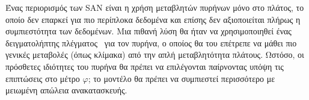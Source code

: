 Ένας περιορισμός των SAN είναι η χρήση μεταβλητών πυρήνων μόνο στο πλάτος, το οποίο δεν επαρκεί για πιο περίπλοκα δεδομένα και επίσης δεν αξιοποιείται πλήρως η συμπιεστότητα των δεδομένων.
Μια πιθανή λύση θα ήταν να χρησιμοποιηθεί ένας δειγματολήπτης πλέγματος~\cite{jaderberg2015spatial} για τον πυρήνα, ο οποίος θα του επέτρεπε να μάθει πιο γενικές μεταβολές (όπως κλίμακα) από την απλή μεταβλητότητα πλάτους.
Ωστόσο, οι πρόσθετες ιδιότητες του πυρήνα θα πρέπει να επιλέγονται παίρνοντας υπόψη τις επιπτώσεις στο μέτρο $\varphi$; το μοντέλο θα πρέπει να συμπιεστεί περισσότερο με μειωμένη απώλεια ανακατασκευής.

\clearpage


